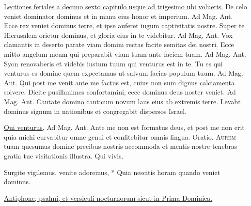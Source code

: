 \begin{multicols*}{2}
\newline \ul{Lectiones feriales a decimo sexto capitulo usque ad trigesimo ubi volueris.}
 De celo veniet dominator dominus et in manu eius honor et imperium. {\color{Red} Ad Mag. Ant.} Ecce rex veniet dominus terre, et ipse auferet iugum captivitatis nostre.
 Super te Hierusalem orietur dominus, et gloria eius in te videbitur. {\color{Red} Ad Mag. Ant.} Vox clamantis in deserto parate viam domini rectas facite semitas dei nostri.
 Ecce mitto angelum meum qui preparabit viam tuam ante faciem tuam. {\color{Red} Ad Mag. Ant.} Syon renovaberis et videbis iustum tuum qui venturus est in te.
 Tu es qui venturus es domine quem expectamus ut salvum facias populum tuum. {\color{Red} Ad Mag. Ant.} Qui post me venit ante me factus est, cuius non sum dignus calciamenta solvere.
 Dicite pusillanimes confortamini, ecce dominus deus noster veniet. {\color{Red} Ad Mag. Ant.} Cantate domino canticum novum laus eius ab extremis terre.
 Levabt dominus signum in nationibus et congregabit dispersos Israel.
{\color{Red} }
\par {} \R \hyperlink{qui-venturus}{Qui venturus}, {\color{Red} Ad Mag. Ant.} Ante me non est formatus deus, et post me non erit quia michi curvabitur omne genui et confitebitur omnis lingua. {\color{Red} Oratio.}
\lettrine[lines=2]{\zallmancaps \color{Red} A}{urem} tuam quesumus domine precibus nostris accommoda et mentis nostre tenebras gratia tue visitationis illustra. Qui vivis.
\begin{invitatory}
{Surgite vigilemus, venite adoremus, * Quia nescitis horam quando veniet dominus.}
\end{invitatory}
\newline \ul{Antiphone, psalmi, et versiculi nocturnorum sicut in Prima Dominica.}

\end{multicols*}
